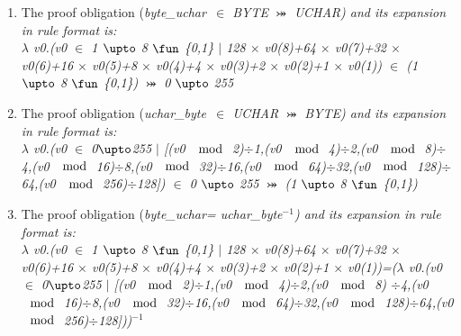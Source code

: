 \begin{enumerate}

\item The proof obligation (\it byte\_uchar\rm \ $\in$ \textit{BYTE} $\bij$ \textit{UCHAR}) and its expansion in rule format is:\\ 
$\lambda$ \it v0\rm .\rm (\it v0 $\in$  \rm 1 $\upto$ \rm 8  $\fun$  \rm \{\rm 0\rm ,\rm 1\rm \}  $\mid$  \rm 1\rm 2\rm 8 $\times$ \it v0\rm (\rm 8\rm )\rm +\rm 6\rm 4 $\times$ \it v0\rm (\rm 7\rm )\rm +\rm 3\rm 2 $\times$ \it v0\rm (\rm 6\rm )\rm +\rm 1\rm 6 $\times$ \it v0\rm (\rm 5\rm )\rm +\rm 8 $\times$ \it v0\rm (\rm 4\rm )\rm +\rm 4 $\times$ \it v0\rm (\rm 3\rm )\rm +\rm 2 $\times$ \it v0\rm (\rm 2\rm )\rm +\rm 1 $\times$ \it v0\rm (\rm 1\rm )\rm ) \rm $\in$ \rm (\rm 1 $\upto$ \rm 8  $\fun$  \rm \{\rm 0\rm ,\rm 1\rm \}\rm )  $\bij$  \rm 0 $\upto$ \rm 2\rm 5\rm 5 \\

\item The proof obligation (\it uchar\_byte\rm \ $\in$ \textit{UCHAR} $\bij$ \textit{BYTE}) and its expansion in rule format is:\\ 
$\lambda$ \it v0\rm .\rm (\it v0 $\in$  \rm 0$\upto$255  $\mid$  \rm \rm  [(\it v0  $\mod$  \rm 2)$\div$1,(\it v0  $\mod$  \rm 4)$\div$\rm 2\rm,(\it v0  $\mod$  \rm 8)$\div$\rm 4\rm,(\it v0  $\mod$  \rm 16)$\div$\rm 8\rm,(\it v0  $\mod$  \rm 32)$\div$\rm 1\rm 6\rm,(\it v0  $\mod$  \rm 6\rm 4)$\div$\rm 3\rm 2\rm,(\it v0  $\mod$  \rm 1\rm 2\rm 8)$\div$\rm 6\rm 4\rm,(\it v0  $\mod$  \rm 2\rm 5\rm 6)$\div$\rm 1\rm 2\rm 8\rm \rm ]\rm ) \rm   $\in$  \rm 0 $\upto$ \rm 2\rm 5\rm 5   $\bij$ \rm (\rm 1 $\upto$ \rm 8  $\fun$  \rm \{\rm 0\rm ,\rm 1\rm \}\rm )\\


\item  The proof obligation (\it byte\_uchar\rm  =  \it uchar\_byte\rm$^{-1}$) and its expansion in rule format is:\\ 
  $\lambda$ \it v0\rm .\rm (\it v0 $\in$  \rm 1 $\upto$ \rm 8  $\fun$  \rm \{\rm 0\rm ,\rm 1\rm \}  $\mid$  \rm 1\rm 2\rm 8 $\times$ \it v0\rm (\rm 8\rm )\rm +\rm 6\rm 4 $\times$ \it v0\rm (\rm 7\rm )\rm +\rm 3\rm 2 $\times$ \it v0\rm (\rm 6\rm )\rm +\rm 1\rm 6 $\times$ \it v0\rm (\rm 5\rm )\rm +\rm 8 $\times$ \it v0\rm (\rm 4\rm )\rm +\rm 4 $\times$ \it v0\rm (\rm 3\rm )\rm +\rm 2 $\times$ \it v0\rm (\rm 2\rm )\rm +\rm 1 $\times$ \it v0\rm (\rm 1\rm )\rm )=($\lambda$ \it v0\rm .\rm (\it v0 $\in$  \rm 0$\upto$255  $\mid$  \rm \rm  [(\it v0  $\mod$  \rm 2)$\div$1,(\it v0  $\mod$  \rm 4)$\div$\rm 2\rm,(\it v0  $\mod$ \rm 8) $\div$\rm 4\rm,(\it v0  $\mod$  \rm 16)$\div$\rm 8\rm,(\it v0  $\mod$  \rm 32)$\div$\rm 1\rm 6\rm,(\it v0  $\mod$ \rm 6\rm 4)$\div$\rm 3\rm 2\rm,(\it v0  $\mod$  \rm 1\rm 2\rm 8)$\div$\rm 6\rm 4\rm,(\it v0  $\mod$  \rm 2\rm 5\rm 6)$\div$\rm 1\rm 2\rm 8\rm \rm ]\rm )\rm)$^{-1}$
\end{enumerate}

